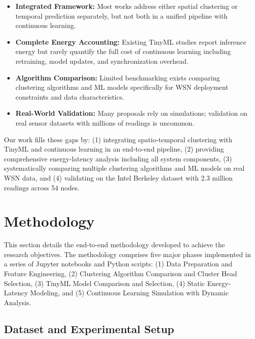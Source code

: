 \documentclass[12pt,a4paper]{article}
\begin{document}
\begin{itemize}
    \item \textbf{Integrated Framework:} Most works address either spatial clustering or temporal prediction separately, but not both in a unified pipeline with continuous learning.

    \item \textbf{Complete Energy Accounting:} Existing TinyML studies report inference energy but rarely quantify the full cost of continuous learning including retraining, model updates, and synchronization overhead.

    \item \textbf{Algorithm Comparison:} Limited benchmarking exists comparing clustering algorithms and ML models specifically for WSN deployment constraints and data characteristics.

    \item \textbf{Real-World Validation:} Many proposals rely on simulations; validation on real sensor datasets with millions of readings is uncommon.
\end{itemize}

Our work fills these gaps by: (1) integrating spatio-temporal clustering with TinyML and continuous learning in an end-to-end pipeline, (2) providing comprehensive energy-latency analysis including all system components, (3) systematically comparing multiple clustering algorithms and ML models on real WSN data, and (4) validating on the Intel Berkeley dataset with 2.3 million readings across 54 nodes.


\newpage
\section{Methodology}

This section details the end-to-end methodology developed to achieve the research objectives. The methodology comprises five major phases implemented in a series of Jupyter notebooks and Python scripts: (1) Data Preparation and Feature Engineering, (2) Clustering Algorithm Comparison and Cluster Head Selection, (3) TinyML Model Comparison and Selection, (4) Static Energy-Latency Modeling, and (5) Continuous Learning Simulation with Dynamic Analysis.

\subsection{Dataset and Experimental Setup}
\end{document}
